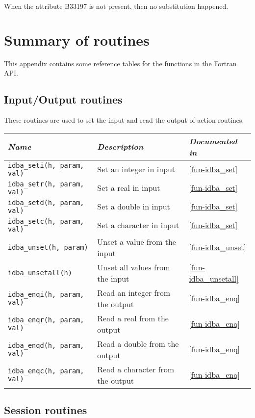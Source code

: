 \documentclass[draft,12pt,a4paper,twoside]{book}
\begin{document}
When the attribute B33197 is not present, then no substitution happened.


\chapter{Summary of routines}

This appendix contains some reference tables for the functions in the Fortran
API.

\section{Input/Output routines}

These routines are used to set the input and read the output of action routines.

\begin{tabular}{|l|l|l|}
\hline
{\em Name}                      & {\em Description}                & {\em Documented in} \\
\hline
{\tt idba\_seti(h, param, val)} & Set an integer in input          & \ref{fun-idba_set} \\
{\tt idba\_setr(h, param, val)} & Set a real in input              & \ref{fun-idba_set} \\
{\tt idba\_setd(h, param, val)} & Set a double in input            & \ref{fun-idba_set} \\
{\tt idba\_setc(h, param, val)} & Set a character in input         & \ref{fun-idba_set} \\
{\tt idba\_unset(h, param)}     & Unset a value from the input     & \ref{fun-idba_unset} \\
{\tt idba\_unsetall(h)}         & Unset all values from the input  & \ref{fun-idba_unsetall} \\
{\tt idba\_enqi(h, param, val)} & Read an integer from the output  & \ref{fun-idba_enq} \\
{\tt idba\_enqr(h, param, val)} & Read a real from the output      & \ref{fun-idba_enq} \\
{\tt idba\_enqd(h, param, val)} & Read a double from the output    & \ref{fun-idba_enq} \\
{\tt idba\_enqc(h, param, val)} & Read a character from the output & \ref{fun-idba_enq} \\
\hline
\end{tabular}


\section{Session routines}
\end{document}

